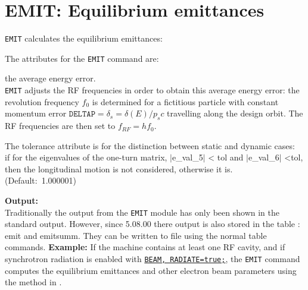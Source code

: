 
\chapter{EMIT: Equilibrium emittances} 
\label{chap:emit}

\texttt{EMIT} calculates the equilibrium emittances: 

\vspace{5mm}

The attributes for the \texttt{EMIT} command are: 

\begin{madlist}
   the average energy error. \\
  \texttt{EMIT} adjusts the RF frequencies in order to obtain this
  average energy error: the revolution frequency $f_0$
  is determined for a fictitious particle with constant momentum error  
  $\mathtt{DELTAP} = \delta_s = \delta(E) / p_s c$ travelling along the
  design orbit. The RF frequencies are then set to   
  $f_{RF} = h f_0$. 

   The tolerance attribute is for the distinction between
  static and dynamic cases: \\
  if for the eigenvalues of the one-turn matrix, $|$e\_val\_5$|$ \textless
  tol and $|$e\_val\_6$|$ \textless tol, then the longitudinal motion is
  not considered, otherwise it is. \\
  (Default:~1.000001)  
\end{madlist}

\textbf{Output:}\\
Traditionally the output from the \texttt{EMIT} module has only been 
shown in the standard output. However, since 5.08.00 there output is also
stored in the table : emit and emitsumm. They can be written to file using 
the normal table commands.
\textbf{Example:}
If the machine contains at least one RF cavity, and if synchrotron
radiation is enabled with \hyperref[sec:beam]{\texttt{BEAM,
    RADIATE=true;}}, the 
\texttt{EMIT} command computes the equilibrium emittances and other
electron beam parameters using the method in \cite{chao1979}.

